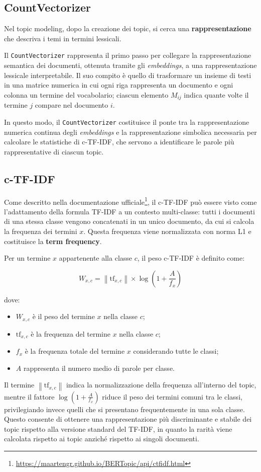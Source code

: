 \subsection{CountVectorizer}
Nel topic modeling, dopo la creazione dei topic, si cerca una \textbf{rappresentazione} che descriva i temi in termini lessicali.

Il \texttt{CountVectorizer} rappresenta il primo passo per collegare la rappresentazione semantica dei documenti, ottenuta tramite gli \textit{embeddings}, a una rappresentazione lessicale interpretabile. 
Il suo compito è quello di trasformare un insieme di testi in una matrice numerica in cui ogni riga rappresenta un documento e ogni colonna un termine del vocabolario; ciascun elemento \( M_{ij} \) indica quante volte il termine \( j \) compare nel documento \( i \).

In questo modo, il \texttt{CountVectorizer} costituisce il ponte tra la rappresentazione numerica continua degli \textit{embeddings} e la rappresentazione simbolica necessaria per calcolare le statistiche di c-TF-IDF, che servono a identificare le parole più rappresentative di ciascun topic.
\subsection{c-TF-IDF}
\noindent Come descritto nella documentazione ufficiale\footnote{\url{https://maartengr.github.io/BERTopic/api/ctfidf.html}}, il c-TF-IDF può essere visto come l’adattamento della formula TF-IDF a un contesto multi-classe: tutti i documenti di una stessa classe vengono concatenati in un unico documento, da cui si calcola la frequenza dei termini \(x\). Questa frequenza viene normalizzata con norma L1 e costituisce la \textbf{term frequency}.

Per un termine \( x \) appartenente alla classe \( c \), il peso c-TF-IDF è definito come:

\[
W_{x,c} = \left\| \mathrm{tf}_{x,c} \right\| \times 
\log \!\left( 1 + \frac{A}{f_x} \right)
\]

dove:
\begin{itemize}
    \item \( W_{x, c} \) è il peso del termine \( x\) nella classe \( c \);
    \item \( \mathrm{tf}_{x,c} \) è la frequenza del termine \( x \) nella classe \( c \);
    \item \( f_x \) è la frequenza totale del termine \( x \) considerando tutte le classi;
    \item \( A \) rappresenta il numero medio di parole per classe. 
\end{itemize}
Il termine \( \left\| \mathrm{tf}_{x,c} \right\| \) indica la normalizzazione della frequenza all'interno del topic, mentre il fattore 
\(\log \!\left( 1 + \tfrac{A}{f_x} \right)\) riduce il peso dei termini comuni tra le classi, privilegiando invece quelli che si presentano frequentemente in una sola classe.  
Questo consente di ottenere una rappresentazione più discriminante e stabile dei topic rispetto alla versione standard del TF-IDF, 
in quanto la rarità viene calcolata rispetto ai topic anziché rispetto ai singoli documenti.

